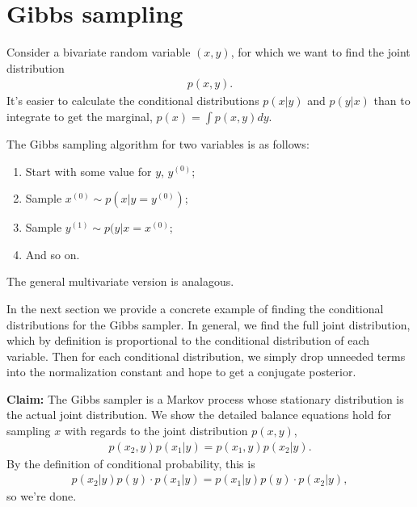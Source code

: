 \documentclass[thesis.tex]{subfiles}
\begin{document}
\section{Gibbs sampling}

Consider a bivariate random variable \((x, y)\), for which we want to find the joint distribution \begin{equation}\begin{aligned}
	p(x, y).
\end{aligned}\end{equation} It's easier to calculate the conditional distributions \(p(x | y)\) and \(p(y | x)\) than to integrate to get the marginal, \(p(x) = \int p(x, y) dy\).

The Gibbs sampling algorithm for two variables is as follows:

\begin{enumerate}
	\item Start with some value for \(y\), \(y^{(0)}\);
	\item Sample \(x^{(0)} \sim p(x | y = y^{(0)})\);
	\item Sample \(y^{(1)} \sim p(y | x = x^{(0)}\);
	\item And so on.
\end{enumerate}

The general multivariate version is analagous.

In the next section we provide a concrete example of finding the conditional distributions for the Gibbs sampler. In general, we find the full joint distribution, which by definition is proportional to the conditional distribution of each variable. Then for each conditional distribution, we simply drop unneeded terms into the normalization constant and hope to get a conjugate posterior.

\bigskip

\noindent\textbf{Claim:} The Gibbs sampler is a Markov process whose stationary distribution is the actual joint distribution. We show the detailed balance equations hold for sampling \(x\) with regards to the joint distribution \(p(x, y)\), \begin{equation}\begin{aligned}
	p(x_2, y) p(x_1| y) = p(x_1, y) p(x_2 | y).
\end{aligned}\end{equation} By the definition of conditional probability, this is \begin{equation}\begin{aligned}
	p(x_2 | y) p(y) \cdot p(x_1| y) = p(x_1 | y) p( y) \cdot p(x_2 | y),
\end{aligned}\end{equation} so we're done.
\end{document}
